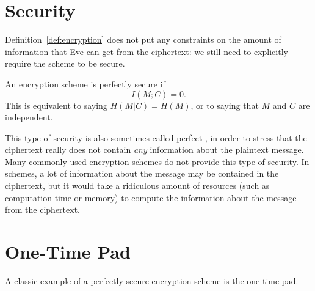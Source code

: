 \section{Security}
Definition~\ref{def:encryption} does not put any constraints on the amount of information that Eve can get from the ciphertext: we still need to explicitly require the scheme to be secure.

\begin{definition} \label{def:perfectsecurity}
An encryption scheme is perfectly secure if
\[
I(M;C) = 0.
\]
This is equivalent to saying $H(M|C) = H(M)$, or to saying that $M$ and $C$ are independent.
\end{definition}
This type of security is also sometimes called perfect , in order to stress that the ciphertext really does not contain \emph{any} information about the plaintext message. Many commonly used encryption schemes do not provide this type of security. In  schemes, a lot of information about the message may be contained in the ciphertext, but it would take a ridiculous amount of resources (such as computation time or memory) to compute the information about the message from the ciphertext.


\section{One-Time Pad}
A classic example of a perfectly secure encryption scheme is the one-time pad.

